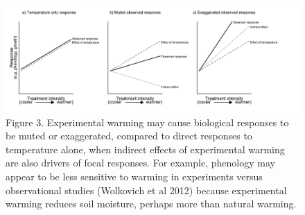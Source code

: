 \documentclass{article}
\begin{document}
 \begin{figure}[p]
     \centering
 \includegraphics{figures/DirIndWarmingEffects.pdf}    
 \caption{Figure 3. Experimental warming may cause biological responses to be muted or exaggerated, compared to direct responses to temperature alone, when indirect effects of experimental warming are also drivers of focal responses. For example, phenology may appear to be less sensitive to warming in experiments versus observational studies (Wolkovich et al 2012) because experimental warming reduces soil moisture, perhaps more than natural warming.}
 \end{figure}
\end{document}
